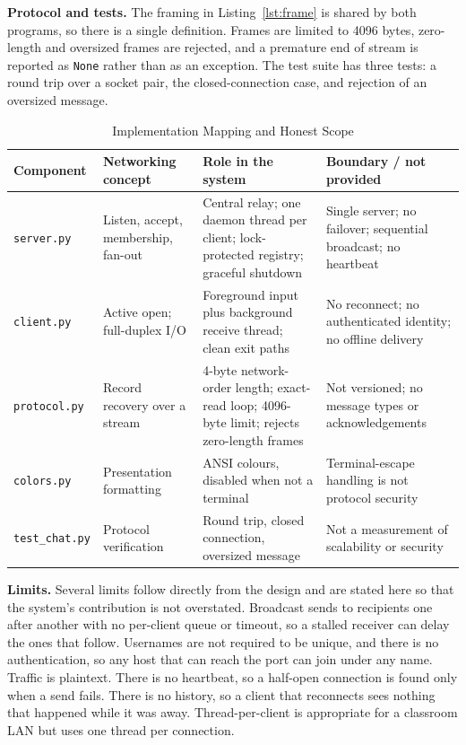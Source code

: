 \documentclass[conference]{IEEEtran}
\newcommand{\code}[1]{\texttt{#1}}
\begin{document}
\textbf{Protocol and tests.} The framing in Listing~\ref{lst:frame} is shared by both programs, so there is a single definition. Frames are limited to 4096 bytes, zero-length and oversized frames are rejected, and a premature end of stream is reported as \code{None} rather than as an exception. The test suite has three tests: a round trip over a socket pair, the closed-connection case, and rejection of an oversized message.

\begin{table}[t]
\centering
\caption{Implementation Mapping and Honest Scope}
\label{tab:mapping}
\footnotesize
\begin{tabularx}{\textwidth}{@{}l l Y Y@{}}
\toprule
\textbf{Component} & \textbf{Networking concept} & \textbf{Role in the system} & \textbf{Boundary / not provided} \\
\midrule
\code{server.py} & Listen, accept, membership, fan-out & Central relay; one daemon thread per client; lock-protected registry; graceful shutdown & Single server; no failover; sequential broadcast; no heartbeat \\
\code{client.py} & Active open; full-duplex I/O & Foreground input plus background receive thread; clean exit paths & No reconnect; no authenticated identity; no offline delivery \\
\code{protocol.py} & Record recovery over a stream & 4-byte network-order length; exact-read loop; 4096-byte limit; rejects zero-length frames & Not versioned; no message types or acknowledgements \\
\code{colors.py} & Presentation formatting & ANSI colours, disabled when not a terminal & Terminal-escape handling is not protocol security \\
\code{test\_chat.py} & Protocol verification & Round trip, closed connection, oversized message & Not a measurement of scalability or security \\
\bottomrule
\end{tabularx}
\end{table}

\textbf{Limits.} Several limits follow directly from the design and are stated here so that the system's contribution is not overstated. Broadcast sends to recipients one after another with no per-client queue or timeout, so a stalled receiver can delay the ones that follow. Usernames are not required to be unique, and there is no authentication, so any host that can reach the port can join under any name. Traffic is plaintext. There is no heartbeat, so a half-open connection is found only when a send fails. There is no history, so a client that reconnects sees nothing that happened while it was away. Thread-per-client is appropriate for a classroom LAN but uses one thread per connection.
\end{document}
